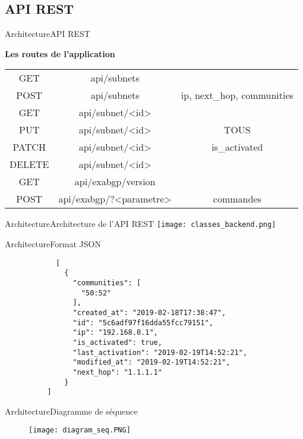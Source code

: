 \subsection{API REST}

\begin{frame}{Architecture}{API REST}

\textbf{Les routes de l'application}

\begin{table}
    \begin{tabulary}{\textwidth}{|C C C|}
        \hline
        \color{background}{Méthode HTTP} & \color{background}{URI} & \color{background}{Paramètres}\\
        \hline
	    GET & api/subnets & \\
	    POST & api/subnets & ip, next\_hop, communities \\
	    \hline
	    GET & api/subnet/<id> & \\
	    PUT & api/subnet/<id> & TOUS \\
	    PATCH & api/subnet/<id> & is\_activated \\
	    DELETE & api/subnet/<id> & \\ 
	    \hline
	    GET & api/exabgp/version & \\
	    POST & api/exabgp/?<parametre> & commandes \\
	    \hline
	\end{tabulary}
\end{table}
\end{frame}

\begin{frame}{Architecture}{Architecture de l'API REST}
    \texttt{[image: classes\_backend.png]}
\end{frame}

\begin{frame}[fragile]{Architecture}{Format JSON}
    \begin{minipage}{0.3\textwidth}
        \begin{verbatim}
            [
              {
                "communities": [
                  "50:52"
                ], 
                "created_at": "2019-02-18T17:38:47", 
                "id": "5c6adf97f16dda55fcc79151", 
                "ip": "192.168.0.1", 
                "is_activated": true, 
                "last_activation": "2019-02-19T14:52:21", 
                "modified_at": "2019-02-19T14:52:21", 
                "next_hop": "1.1.1.1"
              }
          ]
        \end{verbatim}
    \end{minipage}
\end{frame}

\begin{frame}{Architecture}{Diagramme de séquence}
    \begin{figure}
         \centering
        \texttt{[image: diagram\_seq.PNG]}
        \label{fig:my_label}
    \end{figure}
   
\end{frame}
